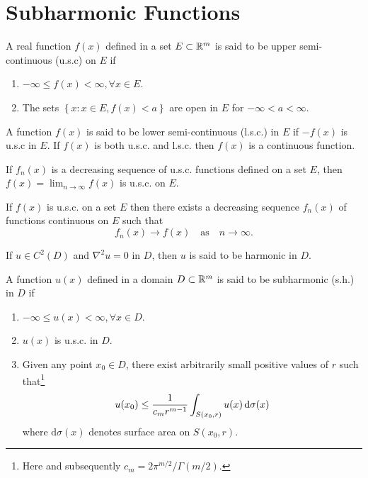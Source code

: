 \tableofcontents
\section{Subharmonic Functions}
\begin{definition}
	A real function $f(x)$ defined in a set $E\subset \mathbb{R}^{m}$ is said to be upper semi-continuous (u.s.c) on $E$ if
	\begin{enumerate}
		\item $-\infty\le f(x)<\infty,\forall x\in E$.
		\item The sets $\left\{x:x\in E,f(x)<a\right\} $ are open in $E$ for $-\infty<a<\infty$. 
	\end{enumerate}
	A function $f(x)$ is said to be lower semi-continuous (l.s.c.) in $E$ if $-f(x)$ is u.s.c in $E$. If $f(x)$ is both u.s.c. and l.s.c. then $f(x)$ is a continuous function.
\end{definition}

\begin{theorem}
	If $f_n(x)$ is a decreasing sequence of u.s.c. functions defined on a set $E$, then $\displaystyle f(x)=\lim_{n\to \infty}f(x)$ is u.s.c. on $E$.
\end{theorem}

\begin{theorem}
	If $f(x)$ is u.s.c. on a set $E$ then there exists a decreasing sequence $f_n(x)$ of functions continuous on $E$ such that 
	\[
	f_n(x)\to f(x) \quad \text{as}\quad n\to \infty.
	\] 
\end{theorem}

\begin{definition}
	If $u\in C^2(D)$ and $\nabla ^2 u=0$ in $D$, then $u$ is said to be harmonic in $D$.
\end{definition}

\begin{definition}\label{def:subharmonic}
	A function $u(x)$ defined in a domain $D\subset \mathbb{R}^{m}$ is said to be subharmonic (s.h.) in $D$ if 
	\begin{enumerate}
		\item $-\infty\le u(x)<\infty,\forall x \in D$.
		\item $u(x)$ is u.s.c. in $D$. 
		\item  Given any point $x_0 \in D$, there exist arbitrarily small positive values of $r$ such that\footnote{Here and subsequently $c_m=2\pi^{m /2} /\Gamma(m /2)$.}
			\[
			u(x_0)\le \frac{1}{c_m r^{m-1}}\int_{S(x_0,r)}u(x)\,\mathrm{d} \sigma(x)
			\] where $\mathrm{d}\sigma(x)$ denotes surface area on $S(x_0,r)$.
	\end{enumerate}
\end{definition}

